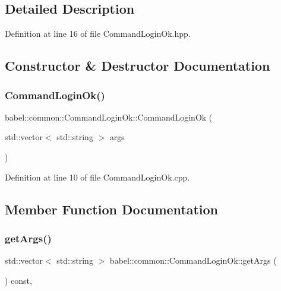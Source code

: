 \subsection{Detailed Description}


Definition at line 16 of file Command\+Login\+Ok.\+hpp.



\subsection{Constructor \& Destructor Documentation}
\mbox{\label{classbabel_1_1common_1_1_command_login_ok_a52d291158086994baed776a75d565221}} 
\subsubsection{\texorpdfstring{Command\+Login\+Ok()}{CommandLoginOk()}}
{\footnotesize\ttfamily babel\+::common\+::\+Command\+Login\+Ok\+::\+Command\+Login\+Ok (\begin{DoxyParamCaption}\item[{std\+::vector$<$ std\+::string $>$}]{args }\end{DoxyParamCaption})}



Definition at line 10 of file Command\+Login\+Ok.\+cpp.



\subsection{Member Function Documentation}
\mbox{\label{classbabel_1_1common_1_1_command_login_ok_af7bbc68d6cbe71a9935b19c19fdf0592}} 
\subsubsection{\texorpdfstring{get\+Args()}{getArgs()}}
{\footnotesize\ttfamily std\+::vector$<$ std\+::string $>$ babel\+::common\+::\+Command\+Login\+Ok\+::get\+Args (\begin{DoxyParamCaption}{ }\end{DoxyParamCaption}) const\hspace{0.3cm}{\ttfamily [override]}, {\ttfamily [virtual]}}




